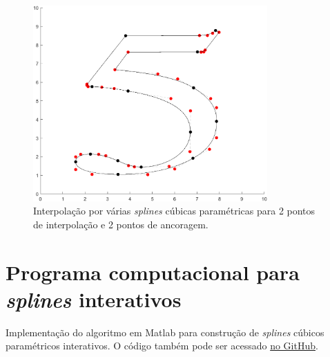 \documentclass{article}
\begin{document}
\begin{enumerate}
\begin{enumerate}
                    \begin{figure}[!h]
                        \centering
                        \includegraphics[width=0.8\textwidth]{5.png}
                        \caption{Interpolação por várias \textit{splines} cúbicas paramétricas
                        para 2 pontos de interpolação e 2 pontos de ancoragem.}
                        \label{fig:5}
                    \end{figure}
                                        
            \end{enumerate}

    \end{enumerate}

    \clearpage

    \appendix

    \section{Programa computacional para \textit{splines} interativos}
        \label{appendix:splines}

        Implementação do algoritmo em Matlab
        para construção de \textit{splines} cúbicos paramétricos
        interativos. O código também pode ser acessado
        \href{https://github.com/lucasresck/introduction-to-numerical-analysis/blob/master/list_3/interactive_spline.m}{no GitHub}.
\end{document}
